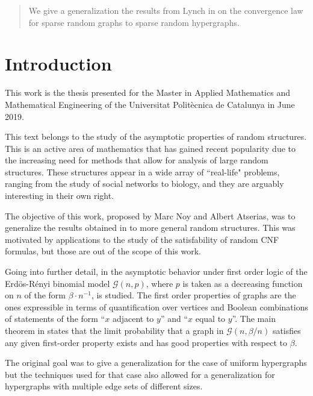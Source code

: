 \documentclass[11pt,notitlepage,a4paper]{article}
\theoremstyle{definition}
\begin{document}
	
	
	
\begin{abstract}
	We give a generalization the results from Lynch in \cite{lynch1992probabilities}
	on the convergence law for sparse random graphs to sparse random hypergraphs.
\end{abstract}
\clearpage
\tableofcontents
\clearpage

\section*{Introduction}

This work is the thesis presented for the Master in Applied Mathematics and 
Mathematical Engineering of the Universitat Politècnica de Catalunya in 
June 2019. \par

This text belongs to the study of the asymptotic properties of random structures.
This is an active area of mathematics that has gained recent popularity due to 
the increasing need for methods that allow for analysis of large random
structures. These structures appear in a wide array of 
``real-life" problems, ranging
from the study of social networks to biology, and they are
arguably interesting in their own right.\par

The objective of this work, proposed by Marc Noy and Albert Atserias, was 
to generalize the results obtained in \cite{lynch1992probabilities} to more
general random structures. This was motivated by applications to the study
of the satisfability of random CNF formulas, but those are out of the scope of 
this work. \par

Going into further detail, in \cite{lynch1992probabilities} the asymptotic 
behavior under first order logic of the Erdös-Rényi binomial model $\mathcal{G}(n,p)$, where
$p$ is taken as a decreasing function on $n$ of the form $\beta\cdot n^{-1}$,
is studied. The first order properties of graphs are the ones expressible in 
terms of quantification over vertices and Boolean combinations of statements 
of the form ``$x$ adjacent to $y$'' and  ``$x$ equal to $y$''. The main theorem
in \cite{lynch1992probabilities} states that the limit probability that a graph
in $\mathcal{G}(n,\beta/n)$ satisfies any given first-order property exists
and has good properties with respect to $\beta$. \par


The original goal was to give a generalization for the case of uniform hypergraphs
but the techniques used for that case also allowed for a generalization for 
hypergraphs with multiple edge sets of different sizes.  
\end{document}
